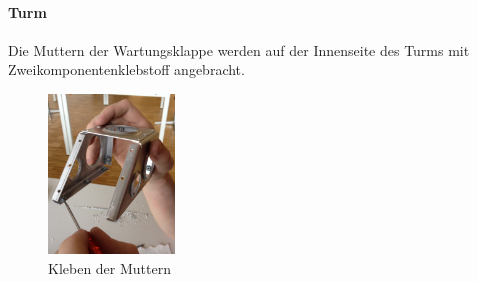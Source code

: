 \paragraph{Turm}
Die Muttern der Wartungsklappe werden auf der Innenseite des Turms mit 
Zweikomponentenklebstoff angebracht. 

\begin{figure}[h!]
	\centering
	\includegraphics[width=0.3\textwidth]{fig/IMG_2292.JPG}
	\caption{Kleben der Muttern}
	\label{fig:Muttern Kleben}
\end{figure}

